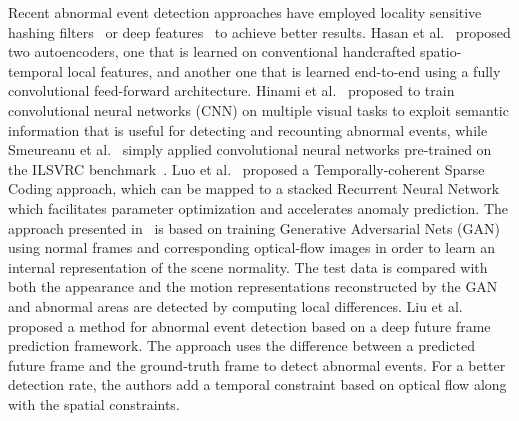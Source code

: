\documentclass[10pt,twocolumn,letterpaper]{article}
\begin{document}
Recent abnormal event detection approaches have employed locality sensitive hashing filters~\cite{Zhang-PR-2016} or deep features~\cite{Hasan-CVPR-2016,Hinami-ICCV-2017,Liu-CVPR-2018,Luo-ICCV-2017,Ravanbakhsh-ICIP-2017,Smeureanu-ICIAP-2017,Xu-BMVC-2015} to achieve better results. Hasan et al.~\cite{Hasan-CVPR-2016} proposed two autoencoders, one that is learned on conventional handcrafted spatio-temporal local features, and another one that is learned end-to-end using a fully convolutional feed-forward architecture. Hinami et al.~\cite{Hinami-ICCV-2017} proposed to train convolutional neural networks (CNN) on multiple visual tasks to exploit semantic information that is useful for detecting and recounting abnormal events, while Smeureanu et al.~\cite{Smeureanu-ICIAP-2017} simply applied convolutional neural networks pre-trained on the ILSVRC benchmark~\cite{Russakovsky2015}. Luo et al.~\cite{Luo-ICCV-2017} proposed a Temporally-coherent Sparse Coding approach, which can be mapped to a stacked Recurrent Neural Network which facilitates parameter optimization and accelerates anomaly prediction. The approach presented in~\cite{Ravanbakhsh-ICIP-2017} is based on training Generative Adversarial Nets (GAN) using normal frames and corresponding optical-flow images in order to learn an internal representation of the scene normality. The test data is compared with both the appearance and the motion representations reconstructed by the GAN and abnormal areas are detected by computing local differences. Liu et al.~\cite{Liu-CVPR-2018} proposed a method for abnormal event detection based on a deep future frame prediction framework. The approach uses the difference between a predicted future frame and the ground-truth frame to detect abnormal events. For a better detection rate, the authors add a temporal constraint based on optical flow along with the spatial constraints.
\end{document}

